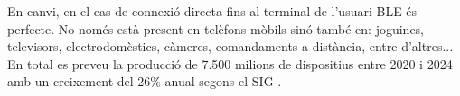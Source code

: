 En canvi, en el cas de connexió directa fins al terminal de l'usuari BLE és perfecte.
No només està present en telèfons mòbils sinó també en: joguines, televisors, electrodomèstics, càmeres, comandaments a distància, entre d'altres...
En total es preveu la producció de 7.500 milions de dispositius entre 2020 i 2024 amb un creixement del 26\% anual segons el SIG \cite{Bluetooth_Market_Update_2020}.
